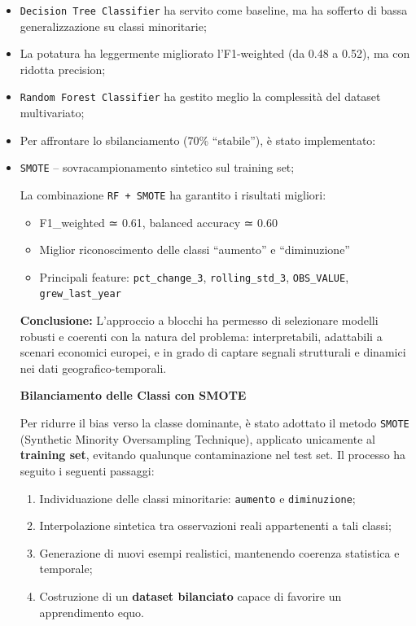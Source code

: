\documentclass[conference]{IEEEtran}
\begin{document}
\begin{itemize} \item \texttt{Decision Tree Classifier} ha servito come baseline, ma ha sofferto di bassa generalizzazione su classi minoritarie; \item La potatura ha leggermente migliorato l’F1-weighted (da 0.48 a 0.52), ma con ridotta precision; \item \texttt{Random Forest Classifier} ha gestito meglio la complessità del dataset multivariato; \item Per affrontare lo sbilanciamento (70\% “stabile”), è stato implementato:  \item \texttt{SMOTE} – sovracampionamento sintetico sul training set; 

La combinazione \texttt{RF + SMOTE} ha garantito i risultati migliori:

\begin{itemize} \item F1\_weighted ≃ 0.61, balanced accuracy ≃ 0.60 \item Miglior riconoscimento delle classi “aumento” e “diminuzione” \item Principali feature: \texttt{pct\_change\_3}, \texttt{rolling\_std\_3}, \texttt{OBS\_VALUE}, \texttt{grew\_last\_year} \end{itemize}

\vspace{0.8em} \noindent\textbf{Conclusione:} L’approccio a blocchi ha permesso di selezionare modelli robusti e coerenti con la natura del problema: interpretabili, adattabili a scenari economici europei, e in grado di captare segnali strutturali e dinamici nei dati geografico-temporali.




\noindent\textbf{Bilanciamento delle Classi con SMOTE}

Per ridurre il bias verso la classe dominante, è stato adottato il metodo \texttt{SMOTE} (Synthetic Minority Oversampling Technique), applicato unicamente al \textbf{training set}, evitando qualunque contaminazione nel test set. Il processo ha seguito i seguenti passaggi:

\begin{enumerate} \item Individuazione delle classi minoritarie: \texttt{aumento} e \texttt{diminuzione}; \item Interpolazione sintetica tra osservazioni reali appartenenti a tali classi; \item Generazione di nuovi esempi realistici, mantenendo coerenza statistica e temporale; \item Costruzione di un \textbf{dataset bilanciato} capace di favorire un apprendimento equo. \end{enumerate}


\end{itemize}
\end{document}
